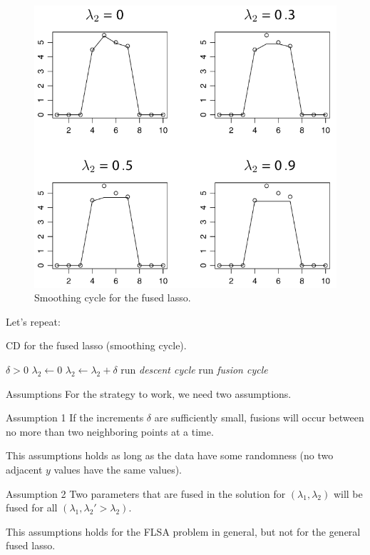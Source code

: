 \documentclass[10pt,ignorenonframetext]{beamer}
\begin{document}
\begin{frame}
\begin{figure}
    \centering
    \includegraphics[width=0.7\linewidth]{figures/smoothing-cycle.png}
    \caption{Smoothing cycle for the fused lasso.}
\end{figure}
\end{frame}

\begin{frame}

Let's repeat:
\begin{algorithm}[H]
\caption{CD for the fused lasso (smoothing cycle).}
    \begin{algorithmic}
        \Require \(\delta > 0\)
        \State \(\lambda_2 \gets 0\)
        \Repeat 
            \State \(\lambda_2 \gets \lambda_2 + \delta\)
            \Repeat 
                \State run \emph{descent cycle}
                \State run \emph{fusion cycle}
    \end{algorithmic}
\end{algorithm}
\end{frame}

\begin{frame}{Assumptions}
For the strategy to work, we need two assumptions.

\begin{block}{Assumption 1}
    If the increments \(\delta\) are sufficiently small, fusions will occur between no more than two neighboring points at a time. \medskip
    
    This assumptions holds as long as the data have some randomness (no two adjacent \(y\) values have the same values).
\end{block}

\pause

\begin{block}{Assumption 2}
    Two parameters that are fused in the solution for \((\lambda_1,\lambda_2)\) will be fused for all \((\lambda_1, \lambda_2' > \lambda_2)\). \medskip
    
    This assumptions holds for the FLSA problem in general, \alert{but not for the general fused lasso}.
\end{block}

\end{frame}
\end{document}
